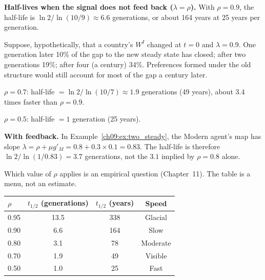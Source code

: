 \documentclass[../structural_economics_book.tex]{subfiles}
\begin{document}
\begin{example}\label{ch09:ex:hysteresis}
\textbf{Half-lives when the signal does not feed back ($\lambda = \rho$).} With $\rho = 0.9$, the half-life is $\ln 2 / \ln(10/9) \approx 6.6$ generations, or about 164 years at 25 years per generation.

Suppose, hypothetically, that a country's $W^I$ changed at $t = 0$ and $\lambda = 0.9$. One generation later 10\% of the gap to the new steady state has closed; after two generations 19\%; after four (a century) 34\%. Preferences formed under the old structure would still account for most of the gap a century later.

$\rho = 0.7$: half-life $= \ln 2 / \ln(10/7) \approx 1.9$ generations (49 years), about 3.4 times faster than $\rho = 0.9$.

$\rho = 0.5$: half-life $= 1$ generation (25 years).

\textbf{With feedback.} In Example~\ref{ch09:ex:two_steady}, the Modern agent's map has slope $\lambda = \rho + \mu g'_M = 0.8 + 0.3 \times 0.1 = 0.83$. The half-life is therefore $\ln 2/\ln(1/0.83) = 3.7$ generations, not the $3.1$ implied by $\rho = 0.8$ alone.

Which value of $\rho$ applies is an empirical question (Chapter~11). The table is a menu, not an estimate.

\begin{center}
\begin{tabular}{lccc}
\toprule
$\rho$ & $t_{1/2}$ (generations) & $t_{1/2}$ (years) & Speed \\
\midrule
0.95 & 13.5 & 338 & Glacial \\
0.90 & 6.6 & 164 & Slow \\
0.80 & 3.1 & 78 & Moderate \\
0.70 & 1.9 & 49 & Visible \\
0.50 & 1.0 & 25 & Fast \\
\bottomrule
\end{tabular}
\end{center}
\end{example}
\end{document}
